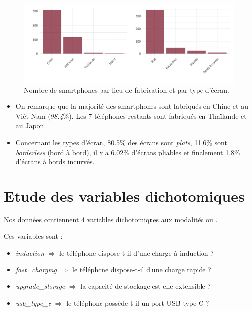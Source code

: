 \documentclass[
  12pt,
]{report}
\providecommand{\tightlist}{%
  \setlength{\itemsep}{0pt}\setlength{\parskip}{0pt}}\usepackage{longtable,booktabs,array}
\renewcommand{\texttt}[1]{\colorbox{light}{\color{highlight}{\ttfamily{#1}}}}
\begin{document}
\begin{figure}[H]

{\centering \includegraphics{report_files/figure-pdf/location_prop-1.pdf}

}

\caption{Nombre de smartphones par lieu de fabrication et par type
d'écran.}

\end{figure}%

\begin{itemize}
\item
  On remarque que la majorité des smartphones sont fabriqués en Chine et
  au Viêt Nam (\emph{98.4}\%). Les 7 téléphones restants sont fabriqués
  en Thaïlande et au Japon.
\item
  Concernant les types d'écran, 80.5\% des écrans sont \emph{plats},
  11.6\% sont \emph{borderless} (bord à bord), il y a 6.02\% d'écrans
  pliables et finalement 1.8\% d'écrans à bords incurvés.
\end{itemize}

\newpage

\section{Etude des variables
dichotomiques}\label{etude-des-variables-dichotomiques}

Nos données contiennent 4 variables dichotomiques aux modalités
\texttt{TRUE} ou \texttt{FALSE}.

Ces variables sont :

\begin{itemize}
\tightlist
\item
  \emph{induction} \(\Rightarrow\) le téléphone dispose-t-il d'une
  charge à induction ?
\item
  \emph{fast\_charging} \(\Rightarrow\) le téléphone dispose-t-il d'une
  charge rapide ?
\item
  \emph{upgrade\_storage} \(\Rightarrow\) la capacité de stockage
  est-elle extensible ?
\item
  \emph{usb\_type\_c} \(\Rightarrow\) le téléphone possède-t-il un port
  USB type C ?
\end{itemize}
\end{document}
